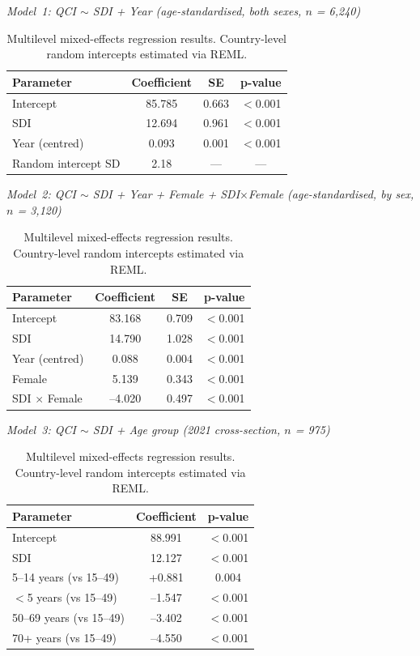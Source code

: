 \documentclass[12pt]{article}
\begin{document}
\begin{table}[htbp]
\centering
\caption{Multilevel mixed-effects regression results. Country-level random intercepts estimated via REML.}
\label{tab:table6}

\vspace{0.5cm}

\textit{Model~1: QCI $\sim$ SDI + Year (age-standardised, both sexes, $n$ = 6{,}240)}

\vspace{0.3cm}

\begin{tabular}{lccc}
\toprule
Parameter & Coefficient & SE & p-value \\
\midrule
Intercept & 85.785 & 0.663 & $<$0.001 \\
SDI & 12.694 & 0.961 & $<$0.001 \\
Year (centred) & 0.093 & 0.001 & $<$0.001 \\
Random intercept SD & 2.18 & --- & --- \\
\bottomrule
\end{tabular}

\vspace{1cm}

\textit{Model~2: QCI $\sim$ SDI + Year + Female + SDI$\times$Female (age-standardised, by sex, $n$ = 3{,}120)}

\vspace{0.3cm}

\begin{tabular}{lccc}
\toprule
Parameter & Coefficient & SE & p-value \\
\midrule
Intercept & 83.168 & 0.709 & $<$0.001 \\
SDI & 14.790 & 1.028 & $<$0.001 \\
Year (centred) & 0.088 & 0.004 & $<$0.001 \\
Female & 5.139 & 0.343 & $<$0.001 \\
SDI $\times$ Female & --4.020 & 0.497 & $<$0.001 \\
\bottomrule
\end{tabular}

\vspace{1cm}

\textit{Model~3: QCI $\sim$ SDI + Age group (2021 cross-section, $n$ = 975)}

\vspace{0.3cm}

\begin{tabular}{lcc}
\toprule
Parameter & Coefficient & p-value \\
\midrule
Intercept & 88.991 & $<$0.001 \\
SDI & 12.127 & $<$0.001 \\
5--14 years (vs 15--49) & +0.881 & 0.004 \\
$<$5 years (vs 15--49) & --1.547 & $<$0.001 \\
50--69 years (vs 15--49) & --3.402 & $<$0.001 \\
70+ years (vs 15--49) & --4.550 & $<$0.001 \\
\bottomrule
\end{tabular}

\end{table}
\end{document}
